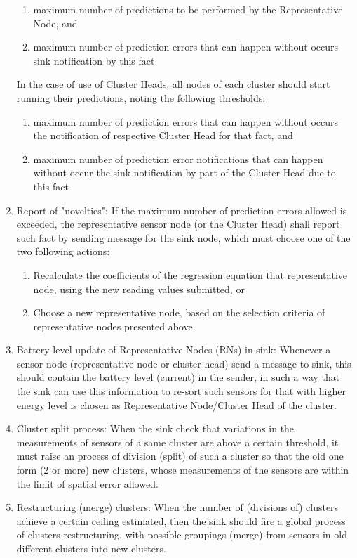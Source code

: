 \documentclass[conference]{IEEEtran}
\begin{document}
\begin{enumerate}
  \begin{enumerate}
    \item maximum number of predictions to be performed by the Representative
    Node, and
    \item maximum number of prediction errors that can happen without occurs
    sink notification by this fact
  \end{enumerate}
  
In the case of use of Cluster Heads, all nodes of each cluster should start running
their predictions, noting the following thresholds:

  \begin{enumerate}
    \item maximum number of prediction errors that can happen without occurs the
    notification of respective Cluster Head for that fact, and
    \item maximum number of prediction error notifications that can happen without occur
    the sink notification by part of the Cluster Head due to this fact
  \end{enumerate}

  \item Report of "novelties": If the maximum number of prediction errors
allowed is exceeded, the representative sensor node (or the Cluster Head) shall
report such fact by sending message for the sink node, which must choose one of
the two following actions:
  
  \begin{enumerate}
    \item Recalculate the coefficients of the regression equation that
representative node, using the new reading values submitted, or
    \item Choose a new representative node, based on the selection criteria of
representative nodes presented above.
  \end{enumerate} 

  \item Battery level update of Representative Nodes (RNs) in sink: Whenever a
sensor node (representative node or cluster head) send a message to sink, this
should contain the battery level (current) in the sender, in such a way that the
sink can use this information to re-sort such sensors for that with
higher energy level is chosen as Representative Node/Cluster Head of the
cluster.
  
  \item Cluster split process: When the sink check that variations in the
measurements of sensors of a same cluster are above a certain threshold, it must
raise an process of division (split) of such a cluster so that the old one form
(2 or more) new clusters, whose measurements of the sensors are within the limit
of spatial error allowed.
  
  \item Restructuring (merge) clusters: When the number of (divisions of)
clusters achieve a certain ceiling estimated, then the sink should fire a global
process of clusters restructuring, with possible groupings (merge) from
sensors in old different clusters into new clusters.
  
\end{enumerate}
\end{document}
